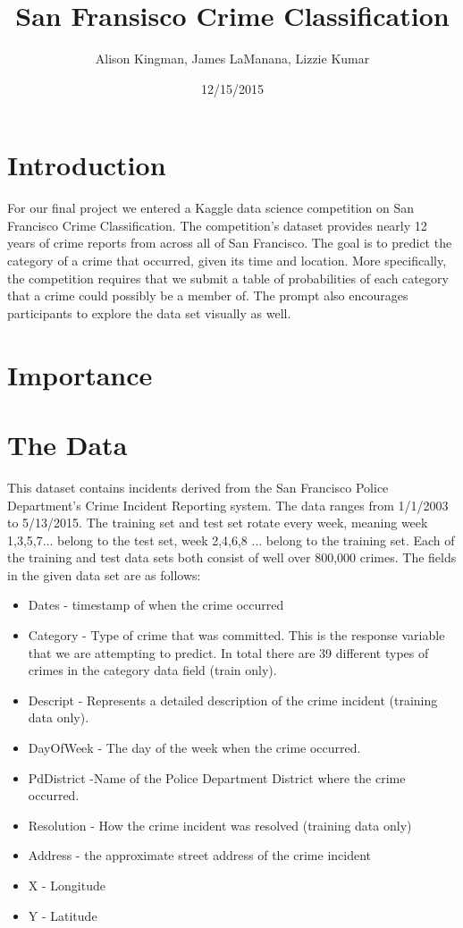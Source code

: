 \documentclass[11pt]{article}
\title{San Fransisco Crime Classification}
\author{Alison Kingman, James LaManana, Lizzie Kumar}
\date{12/15/2015}
\begin{document}


\maketitle

\section*{Introduction}

For our final project we entered a Kaggle data science competition on San Francisco Crime Classification. The competition's dataset provides nearly 12 years of crime reports from across all of San Francisco. The goal is to predict the category of a crime that occurred, given its time and location. More specifically, the competition requires that we submit a table of probabilities of each category that a crime could possibly be a member of.  The prompt also encourages participants to explore the data set visually as well.	
 
\section*{Importance}

 

\section*{The Data}

This dataset contains incidents derived from the San Francisco Police Department's Crime Incident Reporting system. The data ranges from 1/1/2003 to 5/13/2015. The training set and test set rotate every week, meaning week 1,3,5,7... belong to the test set, week 2,4,6,8 ... belong to the training set.  Each of the training and test data sets both consist of well over 800,000 crimes. The fields in the given data set are as follows: 
 
 
\begin{itemize}
\item Dates -  timestamp of when the crime occurred
\item Category - Type of crime that was committed. This is the response variable that we are attempting to predict. In total there are 39 different types of crimes in the category data field (train only).
\item Descript - Represents a detailed description of the crime incident (training data only).
\item DayOfWeek  - The day of the week when the crime occurred.
\item PdDistrict -Name of the Police Department District where the crime occurred.
\item Resolution - How the crime incident was resolved (training data only)
\item Address - the approximate street address of the crime incident 
\item X - Longitude
\item Y - Latitude
\end{itemize}
\end{document}
